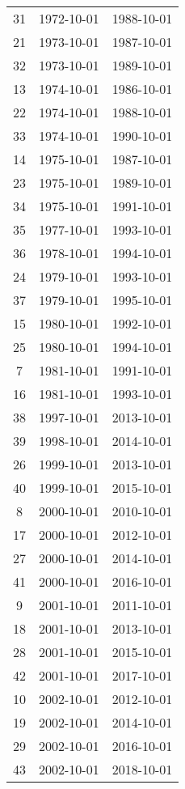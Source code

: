 % 
\begin{tabular}{ccc}
  \hline
  \hline
31 & 1972-10-01 & 1988-10-01 \\ 
  21 & 1973-10-01 & 1987-10-01 \\ 
  32 & 1973-10-01 & 1989-10-01 \\ 
  13 & 1974-10-01 & 1986-10-01 \\ 
  22 & 1974-10-01 & 1988-10-01 \\ 
  33 & 1974-10-01 & 1990-10-01 \\ 
  14 & 1975-10-01 & 1987-10-01 \\ 
  23 & 1975-10-01 & 1989-10-01 \\ 
  34 & 1975-10-01 & 1991-10-01 \\ 
  35 & 1977-10-01 & 1993-10-01 \\ 
  36 & 1978-10-01 & 1994-10-01 \\ 
  24 & 1979-10-01 & 1993-10-01 \\ 
  37 & 1979-10-01 & 1995-10-01 \\ 
  15 & 1980-10-01 & 1992-10-01 \\ 
  25 & 1980-10-01 & 1994-10-01 \\ 
  7 & 1981-10-01 & 1991-10-01 \\ 
  16 & 1981-10-01 & 1993-10-01 \\ 
  38 & 1997-10-01 & 2013-10-01 \\ 
  39 & 1998-10-01 & 2014-10-01 \\ 
  26 & 1999-10-01 & 2013-10-01 \\ 
  40 & 1999-10-01 & 2015-10-01 \\ 
  8 & 2000-10-01 & 2010-10-01 \\ 
  17 & 2000-10-01 & 2012-10-01 \\ 
  27 & 2000-10-01 & 2014-10-01 \\ 
  41 & 2000-10-01 & 2016-10-01 \\ 
  9 & 2001-10-01 & 2011-10-01 \\ 
  18 & 2001-10-01 & 2013-10-01 \\ 
  28 & 2001-10-01 & 2015-10-01 \\ 
  42 & 2001-10-01 & 2017-10-01 \\ 
  10 & 2002-10-01 & 2012-10-01 \\ 
  19 & 2002-10-01 & 2014-10-01 \\ 
  29 & 2002-10-01 & 2016-10-01 \\ 
  43 & 2002-10-01 & 2018-10-01 \\ 

\end{tabular}
